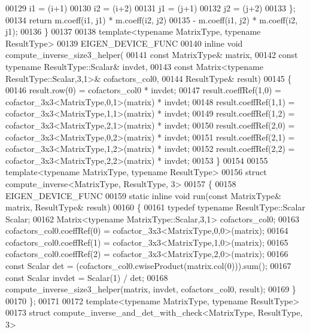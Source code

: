 \begin{DoxyCode}
00129     i1 = (i+1) %
00130     i2 = (i+2) %
00131     j1 = (j+1) %
00132     j2 = (j+2) %
00133   \};
00134   \textcolor{keywordflow}{return} m.coeff(i1, j1) * m.coeff(i2, j2)
00135        - m.coeff(i1, j2) * m.coeff(i2, j1);
00136 \}
00137 
00138 \textcolor{keyword}{template}<\textcolor{keyword}{typename} MatrixType, \textcolor{keyword}{typename} ResultType>
00139 EIGEN\_DEVICE\_FUNC
00140 \textcolor{keyword}{inline} \textcolor{keywordtype}{void} compute\_inverse\_size3\_helper(
00141     \textcolor{keyword}{const} MatrixType& matrix,
00142     \textcolor{keyword}{const} \textcolor{keyword}{typename} ResultType::Scalar& invdet,
00143     \textcolor{keyword}{const} Matrix<typename ResultType::Scalar,3,1>& cofactors\_col0,
00144     ResultType& result)
00145 \{
00146   result.row(0) = cofactors\_col0 * invdet;
00147   result.coeffRef(1,0) =  cofactor\_3x3<MatrixType,0,1>(matrix) * invdet;
00148   result.coeffRef(1,1) =  cofactor\_3x3<MatrixType,1,1>(matrix) * invdet;
00149   result.coeffRef(1,2) =  cofactor\_3x3<MatrixType,2,1>(matrix) * invdet;
00150   result.coeffRef(2,0) =  cofactor\_3x3<MatrixType,0,2>(matrix) * invdet;
00151   result.coeffRef(2,1) =  cofactor\_3x3<MatrixType,1,2>(matrix) * invdet;
00152   result.coeffRef(2,2) =  cofactor\_3x3<MatrixType,2,2>(matrix) * invdet;
00153 \}
00154 
00155 \textcolor{keyword}{template}<\textcolor{keyword}{typename} MatrixType, \textcolor{keyword}{typename} ResultType>
00156 \textcolor{keyword}{struct }compute\_inverse<MatrixType, ResultType, 3>
00157 \{
00158   EIGEN\_DEVICE\_FUNC
00159   \textcolor{keyword}{static} \textcolor{keyword}{inline} \textcolor{keywordtype}{void} run(\textcolor{keyword}{const} MatrixType& matrix, ResultType& result)
00160   \{
00161     \textcolor{keyword}{typedef} \textcolor{keyword}{typename} ResultType::Scalar Scalar;
00162     Matrix<typename MatrixType::Scalar,3,1> cofactors\_col0;
00163     cofactors\_col0.coeffRef(0) =  cofactor\_3x3<MatrixType,0,0>(matrix);
00164     cofactors\_col0.coeffRef(1) =  cofactor\_3x3<MatrixType,1,0>(matrix);
00165     cofactors\_col0.coeffRef(2) =  cofactor\_3x3<MatrixType,2,0>(matrix);
00166     \textcolor{keyword}{const} Scalar det = (cofactors\_col0.cwiseProduct(matrix.col(0))).sum();
00167     \textcolor{keyword}{const} Scalar invdet = Scalar(1) / det;
00168     compute\_inverse\_size3\_helper(matrix, invdet, cofactors\_col0, result);
00169   \}
00170 \};
00171 
00172 \textcolor{keyword}{template}<\textcolor{keyword}{typename} MatrixType, \textcolor{keyword}{typename} ResultType>
00173 \textcolor{keyword}{struct }compute\_inverse\_and\_det\_with\_check<MatrixType, ResultType, 3>

\end{DoxyCode}
